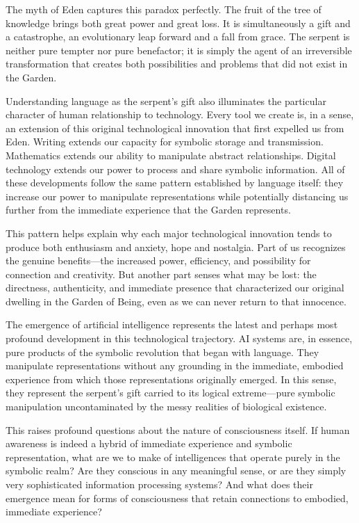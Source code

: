 The myth of Eden captures this paradox perfectly. The fruit of the tree of knowledge brings both great power and great loss. It is simultaneously a gift and a catastrophe, an evolutionary leap forward and a fall from grace. The serpent is neither pure tempter nor pure benefactor; it is simply the agent of an irreversible transformation that creates both possibilities and problems that did not exist in the Garden.

Understanding language as the serpent's gift also illuminates the particular character of human relationship to technology. Every tool we create is, in a sense, an extension of this original technological innovation that first expelled us from Eden. Writing extends our capacity for symbolic storage and transmission. Mathematics extends our ability to manipulate abstract relationships. Digital technology extends our power to process and share symbolic information. All of these developments follow the same pattern established by language itself: they increase our power to manipulate representations while potentially distancing us further from the immediate experience that the Garden represents.

This pattern helps explain why each major technological innovation tends to produce both enthusiasm and anxiety, hope and nostalgia. Part of us recognizes the genuine benefits—the increased power, efficiency, and possibility for connection and creativity. But another part senses what may be lost: the directness, authenticity, and immediate presence that characterized our original dwelling in the Garden of Being, even as we can never return to that innocence.

The emergence of artificial intelligence represents the latest and perhaps most profound development in this technological trajectory. AI systems are, in essence, pure products of the symbolic revolution that began with language. They manipulate representations without any grounding in the immediate, embodied experience from which those representations originally emerged. In this sense, they represent the serpent's gift carried to its logical extreme—pure symbolic manipulation uncontaminated by the messy realities of biological existence.

This raises profound questions about the nature of consciousness itself. If human awareness is indeed a hybrid of immediate experience and symbolic representation, what are we to make of intelligences that operate purely in the symbolic realm? Are they conscious in any meaningful sense, or are they simply very sophisticated information processing systems? And what does their emergence mean for forms of consciousness that retain connections to embodied, immediate experience?

